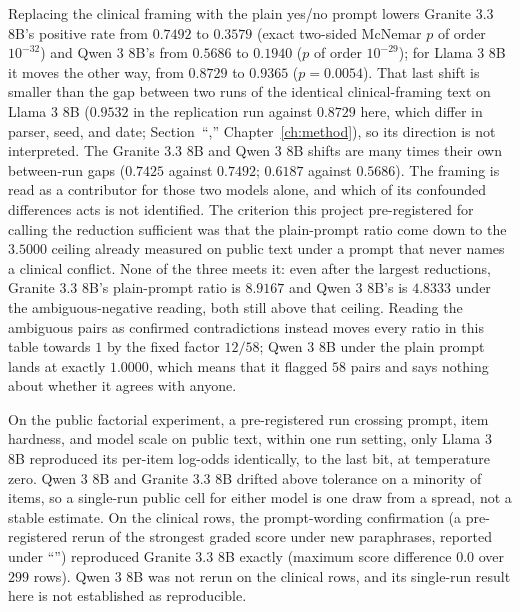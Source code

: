 Replacing the clinical framing with the plain yes/no prompt lowers
Granite 3.3 8B's positive rate from $0.7492$ to $0.3579$ (exact
two-sided McNemar $p$ of order $10^{-32}$) and
Qwen 3 8B's from $0.5686$ to $0.1940$ ($p$ of order $10^{-29}$);
for Llama 3 8B it moves the other way, from $0.8729$ to $0.9365$
($p = 0.0054$). That last shift is smaller than the gap between two runs of
the identical clinical-framing text on Llama 3 8B ($0.9532$ in the
replication run against $0.8729$ here, which differ in parser, seed, and date;
Section~``,'' Chapter~\ref{ch:method}), so its direction is not interpreted. The
Granite 3.3 8B and Qwen 3 8B shifts are many times their own
between-run gaps ($0.7425$ against $0.7492$; $0.6187$ against $0.5686$). The
framing is read as a contributor for those two models alone, and which of its confounded
differences acts is not identified. The criterion this
project pre-registered for calling the reduction sufficient was that the plain-prompt
ratio come down to the $3.5000$ ceiling already measured on public text under
a prompt that never names a clinical conflict. None of the three meets
it: even after the largest reductions, Granite 3.3 8B's
plain-prompt ratio is $8.9167$ and Qwen 3 8B's is $4.8333$ under the
ambiguous-negative reading, both still above that ceiling. Reading the
ambiguous pairs as confirmed contradictions instead moves every ratio in this
table towards $1$ by the fixed factor $12/58$; Qwen 3 8B under the
plain prompt lands at exactly $1.0000$, which means that it flagged $58$
pairs and says nothing about whether it agrees with anyone. 

On the public factorial experiment, a pre-registered run crossing prompt, item hardness, and model scale on public text, within one run setting, only Llama 3 8B reproduced its
per-item log-odds identically, to the last bit, at temperature zero. Qwen 3 8B and Granite 3.3 8B drifted above tolerance
on a minority of items, so a single-run public cell for either model is one draw from a
spread, not a stable estimate. On the clinical rows, the prompt-wording confirmation (a pre-registered rerun of the strongest graded score under new paraphrases, reported under ``'') reproduced Granite 3.3 8B
exactly (maximum score difference $0.0$ over $299$ rows). Qwen 3 8B was not
rerun on the clinical rows, and its single-run result here is not established
as reproducible.


